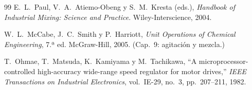 \documentclass[11pt,a4paper,oneside]{report}
\theoremstyle{definition}
\theoremstyle{remark}
\begin{document}
\begin{thebibliography}{99}
E.~L.~Paul, V.~A.~Atiemo-Obeng y S.~M.~Kresta (eds.),
\emph{Handbook of Industrial Mixing: Science and Practice}.
Wiley-Interscience, 2004.

W.~L.~McCabe, J.~C.~Smith y P.~Harriott,
\emph{Unit Operations of Chemical Engineering}, 7.ª ed.
McGraw-Hill, 2005. (Cap.~9: agitación y mezcla.)

T.~Ohmae, T.~Matsuda, K.~Kamiyama y M.~Tachikawa,
``A microprocessor-controlled high-accuracy wide-range speed regulator for
motor drives,''
\emph{IEEE Transactions on Industrial Electronics}, vol.~IE-29, no.~3,
pp.~207--211, 1982.

\end{thebibliography}
\end{document}
